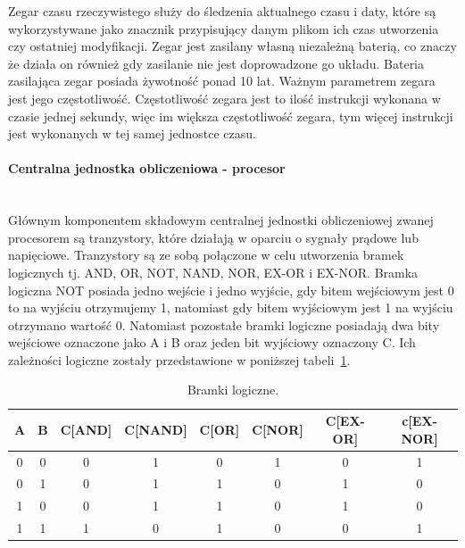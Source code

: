 \documentclass[12p]{article}
\begin{document}
Zegar czasu rzeczywistego służy do śledzenia aktualnego czasu i daty, które są wykorzystywane jako znacznik przypisujący danym plikom ich czas utworzenia czy ostatniej modyfikacji. Zegar jest zasilany własną niezależną baterią, co znaczy że działa on również gdy zasilanie nie jest doprowadzone go układu. Bateria zasilająca zegar posiada żywotność ponad 10 lat. Ważnym parametrem zegara jest jego częstotliwość. Częstotliwość zegara jest to ilość instrukcji wykonana w czasie jednej sekundy, więc im większa częstotliwość zegara, tym więcej instrukcji jest wykonanych w tej samej jednostce czasu.


\paragraph{Centralna jednostka obliczeniowa - procesor} \mbox{} \\

Głównym komponentem składowym centralnej jednostki obliczeniowej zwanej procesorem są tranzystory, które działają w oparciu o sygnały prądowe lub napięciowe. Tranzystory są ze sobą połączone w celu utworzenia bramek logicznych tj. AND, OR, NOT, NAND, NOR, EX-OR i EX-NOR. Bramka logiczna NOT posiada jedno wejście i jedno wyjście, gdy bitem wejściowym jest 0 to na wyjściu otrzymujemy 1, natomiast gdy bitem wyjściowym jest 1 na wyjściu otrzymano wartość 0. Natomiast pozostałe bramki logiczne posiadają dwa bity wejściowe oznaczone jako A i B oraz jeden bit wyjściowy oznaczony C. Ich zależności logiczne zostały przedstawione w poniższej tabeli~\ref{bramki_logiczne}.

\begin{table}[H]
\centering
\begin{tabular}{|c|c|c|c|c|c|c|c|} 
\hline
A& B& C[AND] & C[NAND] & C[OR] & C[NOR] & C[EX-OR] & c[EX-NOR]\\ \hline
0 & 0& 0& 1& 0& 1& 0& 1\\ \hline
0 & 1& 0& 1& 1& 0& 1& 0\\ \hline
1 & 0& 0& 1& 1& 0& 1& 0\\ \hline
1 & 1& 1& 0& 1& 0& 0& 1\\ \hline
\end{tabular}
\caption{Bramki logiczne.}\label{bramki_logiczne}
\end{table}
\end{document}
